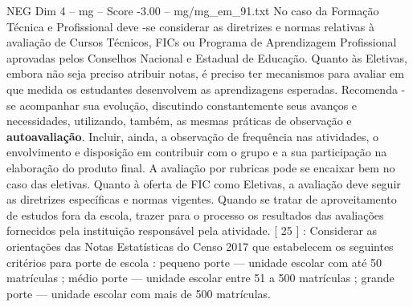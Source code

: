 \begin{textsample}{NEG Dim 4 – mg – Score -3.00 – mg/mg\_em\_91.txt}
No caso da Formação Técnica e Profissional deve -se considerar as diretrizes e normas relativas à avaliação de Cursos Técnicos, FICs ou Programa de Aprendizagem Profissional aprovadas pelos Conselhos Nacional e Estadual de Educação.
Quanto às Eletivas, embora não seja preciso atribuir notas, é preciso ter mecanismos para avaliar em que medida os estudantes desenvolvem as aprendizagens esperadas.
Recomenda -se acompanhar sua evolução, discutindo constantemente seus avanços e necessidades, utilizando, também, as mesmas práticas de observação e \textbf{autoavaliação}.
Incluir, ainda, a observação de frequência nas atividades, o envolvimento e disposição em contribuir com o grupo e a sua participação na elaboração do produto final.
A avaliação por rubricas pode se encaixar bem no caso das eletivas.
Quanto à oferta de FIC como Eletivas, a avaliação deve seguir as diretrizes específicas e normas vigentes.
Quando se tratar de aproveitamento de estudos fora da escola, trazer para o processo os resultados das avaliações fornecidos pela instituição responsável pela atividade. [ 25 ] : Considerar as orientações das Notas Estatísticas do Censo 2017 que estabelecem os seguintes critérios para porte de escola : pequeno porte — unidade escolar com até 50 matrículas ; médio porte — unidade escolar entre 51 a 500 matrículas ; grande porte — unidade escolar com mais de 500 matrículas.

\end{textsample}
